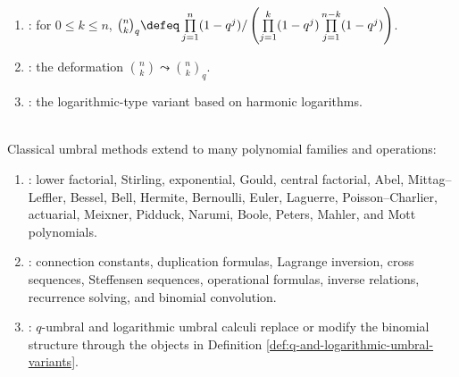 \begin{definition} \label{def:q-and-logarithmic-umbral-variants} 
\begin{enumerate}[label=(\roman*)]
\setlength{\itemsep}{0pt}
\item {}: for $0\leq k\leq n$,
$\binom{n}{k}_q\defeq
\prod\limits_{j=1}^{n}(1-q^j)/
\left(\prod\limits_{j=1}^{k}(1-q^j)
\prod\limits_{j=1}^{n-k}(1-q^j)\right)$.
\item {}: the deformation $\binom{n}{k}\leadsto\binom{n}{k}_q$.
\item {}: the logarithmic-type variant based on harmonic logarithms.
\end{enumerate}
\end{definition}

\begin{remark} \label{rem:umbral-calculus-further-directions} \\
Classical umbral methods extend to many polynomial families and operations:
\begin{enumerate}[label=(\roman*)]
\setlength{\itemsep}{0pt}
\item {}: lower factorial, Stirling, exponential, Gould, central
factorial, Abel, Mittag--Leffler, Bessel, Bell, Hermite, Bernoulli, Euler,
Laguerre, Poisson--Charlier, actuarial, Meixner, Pidduck, Narumi, Boole,
Peters, Mahler, and Mott polynomials.
\item {}: connection constants, duplication formulas, Lagrange
inversion, cross sequences, Steffensen sequences, operational formulas,
inverse relations, recurrence solving, and binomial convolution.
\item {}: $q$-umbral and logarithmic umbral calculi replace or
modify the binomial structure through the objects in Definition
\ref{def:q-and-logarithmic-umbral-variants}.
\end{enumerate}
\end{remark}
